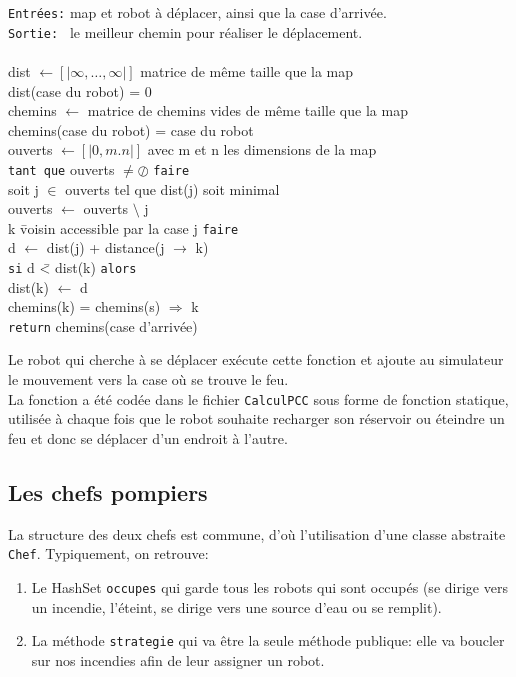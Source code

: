 \documentclass[a4paper,8pt]{article} %
\begin{document}
\begin{tabbing}
{\tt Entrées:} map et robot à déplacer, ainsi que la case d'arrivée.\\
{\tt Sortie: } le meilleur chemin pour réaliser le déplacement. \\ \\
dist \(\leftarrow [|\infty,\ldots ,\infty|]\)          matrice de même taille que la map \\
dist(case du robot) = 0\\
chemins \(\leftarrow \)          matrice de chemins vides de même taille que la map\\
chemins(case du robot) = case du robot \\
ouverts \(\leftarrow [|0,m.n|]\)          avec m et n les dimensions de la map\\
{\tt tant que} ouverts \(\neq \oslash \) {\tt faire}\\
\quad soit j \(\in \) ouverts tel que dist(j) soit minimal\\
\quad ouverts \(\leftarrow \) ouverts \(\setminus \) {j}\\
 k \= voisin accessible par la case j {\tt faire} \\
\quad \> d \(\leftarrow \) dist(j) + distance(j \(\rightarrow \) k)\\
\quad \> {\tt si} d \=< dist(k) {\tt alors} \\
\quad \> \> dist(k) \(\leftarrow \) d\\
\quad \> \> chemins(k) = chemins(s) \(\Rightarrow \) k\\
{\tt return} chemins(case d'arrivée)
\end{tabbing}

Le robot qui cherche à se déplacer exécute cette fonction et ajoute au simulateur le mouvement vers la case où se trouve le feu. \\
La fonction a été codée dans le fichier {\tt CalculPCC} sous forme de fonction statique, utilisée à chaque fois que le robot souhaite
recharger son réservoir ou éteindre un feu et donc se déplacer d'un endroit à l'autre.

\subsection{Les chefs pompiers}
La structure des deux chefs est commune, d'où l'utilisation d'une classe abstraite \texttt{Chef}. Typiquement, on retrouve:
\begin{enumerate}
    \item Le HashSet \texttt{occupes} qui garde tous les robots qui sont occupés (se dirige vers un incendie, l'éteint,
    se dirige vers une source d'eau ou se remplit).
    \item La méthode \texttt{strategie} qui va être la seule méthode publique: elle va boucler sur nos incendies afin de leur assigner un robot.
\end{enumerate}
\end{document}
